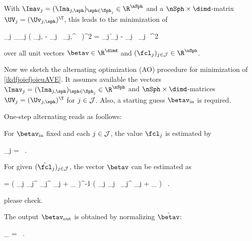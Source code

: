 With \( \Imav_{j} = (\Ima_{j,\sph})_{\sph \in \Sph_{j}} \in \R^{\nSph} \) and a \( \nSph \times \dimd \)-matrix 
\( \UV_{j} = (\Uv_{j,\sph})^{\T} \), this leads to the minimization of
\begin{EQA}[c]
	\sum_{j \in \JJJ} \sum_{\sph \in \Sph_{j}} \bigl( \Ima_{j,\sph} - \fcl_{j} \, \Uv_{j,\sph}^{\T} \, \betav \bigr)^{2} 
	=
	\sum_{j \in \JJJ} \bigl\| \Imav_{j} - \fcl_{j} \, \UV_{j} \, \betav \bigr\|^{2}
	\qquad
\label{ikdfjoiefjoieuAVE}
\end{EQA}
over all unit vectors \( \betav \in \R^{\dimd} \) and \( (\fcl_{j})_{j \in \JJJ} \in \R^{\nSph} \). 

\label{SaverdersiAO}

Now we sketch the alternating optimization (AO) procedure for minimization of \eqref{ikdfjoiefjoieuAVE}.
It assumes available the vectors
\( \Imav_{j} = (\Ima_{j,\sph})_{\sph \in \Sph_{j}} \in \R^{\nSph} \) and \( \nSph \times \dimd \)-matrices
\( \UV_{j} = (\Uv_{j,\sph})^{\T} \) for \( j \in \mathcal{J} \).
Also, a starting guess \( \betav_{\init} \) is required.

One-step alternating reads as foollows:

\begin{mylist}
\item
For \( \betav_{\init} \) fixed and each \( j \in \mathcal{J} \), the value \( \fcl_{j} \) is estimated by
\begin{EQA}[c]
	\hat{\fcl}_{j}
	=
	\, .
\end{EQA}

\item
For given \( (\hat{\fcl}_{j})_{j \in \JJJ} \), the vector \( \betav \) can be estimated as
\begin{EQA}[c]
	\hat{\betav}
	=
	\biggl( \sum_{j \in \JJJ} \hat{\fcl}_{j}^{} \; \UV_{j}^{\T} \UV_{j} + \lambda \Id_{\dimp} \biggr)^{-1}
	\biggl( \sum_{j \in \JJJ} \hat{\fcl}_{j} \, \UV_{j}^{\T} \Imav_{j} + \lambda \betav_{\init} \biggr)
	\, .
\end{EQA}
{\color{blue} please check.}

\item
The output \( \betav_{\outp} \) is obtained by normalizing \( \hat{\betav} \):
\begin{EQA}[c]
	\betav_{\outp}
	=
	 \hat{\betav}
	\, .
\end{EQA}

\end{mylist}

